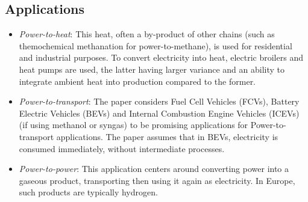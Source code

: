 \documentclass[a4paper]{article}
\begin{document}
\subsection{Applications}
\begin{itemize}
    \item \textit{Power-to-heat}: This heat, often a by-product of other chains (such as themochemical methanation for power-to-methane), is used for residential and industrial purposes. To convert electricity into heat, electric broilers and heat pumps are used, the latter having larger variance and an ability to integrate ambient heat into production compared to the former.
    \item \textit{Power-to-transport}: The paper considers Fuel Cell Vehicles (FCVs), Battery Electric Vehicles (BEVs) and Internal Combustion Engine Vehicles (ICEVs) (if using methanol or syngas) to be promising applications for Power-to-transport applications. The paper assumes that in BEVs, electricity is consumed immediately, without intermediate processes.
    \item \textit{Power-to-power}: This application centers around converting power into a gaseous product, transporting then using it again as electricity. In Europe, such products are typically hydrogen.
\end{itemize}
\end{document}
